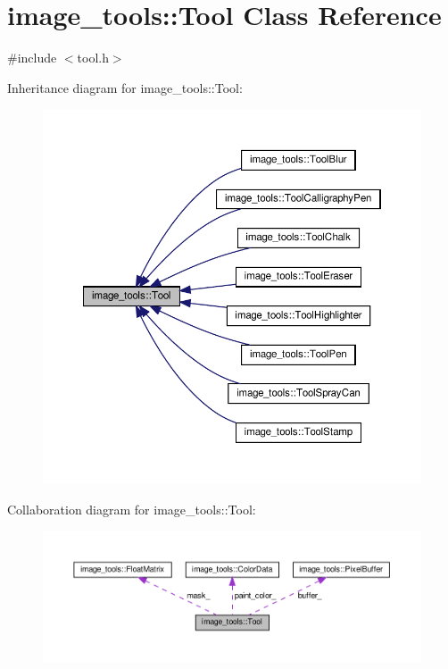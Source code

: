 \hypertarget{classimage__tools_1_1Tool}{}\section{image\+\_\+tools\+:\+:Tool Class Reference}
\label{classimage__tools_1_1Tool}


{\ttfamily \#include $<$tool.\+h$>$}



Inheritance diagram for image\+\_\+tools\+:\+:Tool\+:
\nopagebreak
\begin{figure}[H]
\begin{center}
\leavevmode
\includegraphics[width=350pt]{classimage__tools_1_1Tool__inherit__graph}
\end{center}
\end{figure}


Collaboration diagram for image\+\_\+tools\+:\+:Tool\+:
\nopagebreak
\begin{figure}[H]
\begin{center}
\leavevmode
\includegraphics[width=350pt]{classimage__tools_1_1Tool__coll__graph}
\end{center}
\end{figure}
